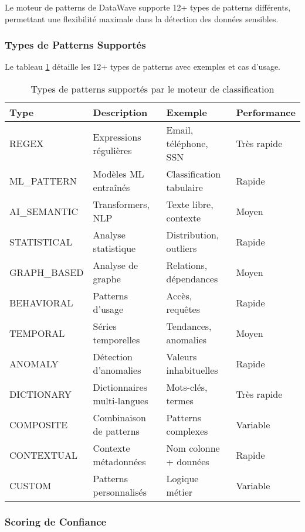 Le moteur de patterns de DataWave supporte 12+ types de patterns différents, permettant une flexibilité maximale dans la détection des données sensibles.

\subsubsection{Types de Patterns Supportés}

Le tableau \ref{tab:types_patterns} détaille les 12+ types de patterns avec exemples et cas d'usage.

\begin{table}[htpb]
\centering
\caption{Types de patterns supportés par le moteur de classification}
\label{tab:types_patterns}
\begin{tabular}{|p{}|p{}|p{}|p{}|}
\hline
\textbf{Type} & \textbf{Description} & \textbf{Exemple} & \textbf{Performance} \\
\hline
REGEX & Expressions régulières & Email, téléphone, SSN & Très rapide \\
\hline
ML\_PATTERN & Modèles ML entraînés & Classification tabulaire & Rapide \\
\hline
AI\_SEMANTIC & Transformers, NLP & Texte libre, contexte & Moyen \\
\hline
STATISTICAL & Analyse statistique & Distribution, outliers & Rapide \\
\hline
GRAPH\_BASED & Analyse de graphe & Relations, dépendances & Moyen \\
\hline
BEHAVIORAL & Patterns d'usage & Accès, requêtes & Rapide \\
\hline
TEMPORAL & Séries temporelles & Tendances, anomalies & Moyen \\
\hline
ANOMALY & Détection d'anomalies & Valeurs inhabituelles & Rapide \\
\hline
DICTIONARY & Dictionnaires multi-langues & Mots-clés, termes & Très rapide \\
\hline
COMPOSITE & Combinaison de patterns & Patterns complexes & Variable \\
\hline
CONTEXTUAL & Contexte métadonnées & Nom colonne + données & Rapide \\
\hline
CUSTOM & Patterns personnalisés & Logique métier & Variable \\
\hline
\end{tabular}
\end{table}

\subsubsection{Scoring de Confiance}

